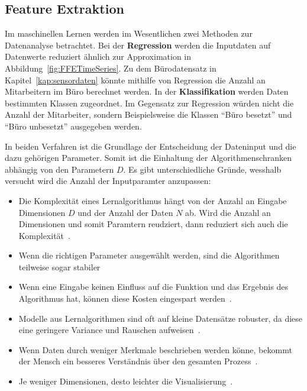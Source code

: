 \subsection{Feature Extraktion}\label{kap:featureextraktionuebersicht}
Im maschinellen Lernen werden im Wesentlichen zwei Methoden zur Datenanalyse betrachtet. Bei der \textbf{Regression} werden die Inputdaten auf Datenwerte reduziert ähnlich zur Approximation in Abbildung\ \ref{fig:FFETimeSeries}. Zu dem Bürodatensatz in Kapitel\ \ref{kap:sensordaten} könnte mithilfe von Regression die Anzahl an Mitarbeitern im Büro berechnet werden. In der \textbf{Klassifikation} werden Daten bestimmten Klassen zugeordnet. Im Gegensatz zur Regression würden nicht die Anzahl der Mitarbeiter, sondern Beispielsweise die Klassen \enquote{Büro besetzt} und \enquote{Büro unbesetzt} ausgegeben werden.

In beiden Verfahren ist die Grundlage der Entscheidung der Dateninput und die dazu gehörigen Parameter. Somit ist die Einhaltung der Algorithmenschranken abhängig von den Parametern $D$. Es gibt unterschiedliche Gründe, wesshalb versucht wird die Anzahl der Inputparamter anzupassen:
\begin{itemize}
  \setlength{\itemsep}{3pt}
  \renewcommand\labelitemi{\textbullet}
  \item Die Komplexität eines Lernalgorithmus hängt von der Anzahl an Eingabe Dimensionen $D$ und der Anzahl der Daten $N$ ab. Wird die Anzahl an Dimensionen und somit Paramtern reudziert, dann reduziert sich auch die Komplexität~\cite{alpaydin2014introduction}.
  \item Wenn die richtigen Parameter ausgewählt werden, sind die Algorithmen teilweise sogar stabiler~\cite{morchen2003time}
  \item Wenn eine Eingabe keinen Einfluss auf die Funktion und das Ergebnis des Algorithmus hat, können diese Kosten eingespart werden~\cite{alpaydin2014introduction}.
  \item Modelle aus Lernalgorithmen sind oft auf kleine Datensätze robuster, da diese eine geringere Variance und Rauschen aufweisen~\cite{alpaydin2014introduction}.
  \item Wenn Daten durch weniger Merkmale beschrieben werden könne, bekommt der Mensch ein besseres Verständnis über den gesamten Prozess~\cite{alpaydin2014introduction}.
  \item Je weniger Dimensionen, desto leichter die Visualisierung~\cite{alpaydin2014introduction}.
\end{itemize}

